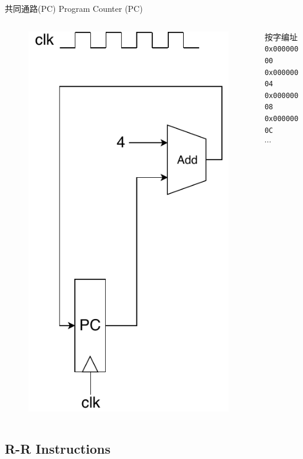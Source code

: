 \documentclass[UTF8]{ctexbeamer}
\begin{document}
\begin{frame}[fragile]{共同通路(PC)}
Program Counter (PC)
\begin{columns}
\begin{column}{0.5\linewidth}
\begin{figure}
\centering
\includegraphics[width=0.5\linewidth]{fig/Lecture2/Datapath-PC.pdf}
\end{figure}
\end{column}
\begin{column}{0.5\linewidth}
按字编址\\
\verb'0x00000000'\\
\verb'0x00000004'\\
\verb'0x00000008'\\
\verb'0x0000000C'\\
$\cdots$
\end{column}
\end{columns}
\end{frame}

\subsection{R-R Instructions}
\begin{frame}
\subsectionpage
\end{frame}
\end{document}

